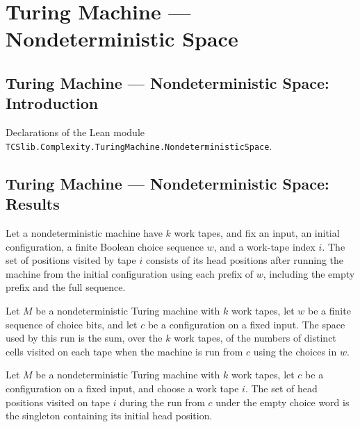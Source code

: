 \section{Turing Machine --- Nondeterministic Space}
\subsection*{Turing Machine --- Nondeterministic Space: Introduction}

Declarations of the Lean module \texttt{TCSlib.Complexity.TuringMachine.NondeterministicSpace}.

\subsection*{Turing Machine --- Nondeterministic Space: Results}

\begin{definition}
\label{Turing.NDTM.visitedWith}
\leanok
{}
Let a nondeterministic machine have $k$ work tapes, and fix an input, an initial
configuration, a finite Boolean choice sequence $w$, and a work-tape index $i$. The set
of positions visited by tape $i$ consists of its head positions after running the
machine from the initial configuration using each prefix of $w$, including the empty
prefix and the full sequence.
\end{definition}

\begin{definition}
\label{Turing.NDTM.spaceUsedWith}
\leanok
{}
Let $M$ be a nondeterministic Turing machine with $k$ work tapes, let $w$ be a finite
sequence of choice bits, and let $c$ be a configuration on a fixed input. The space used
by this run is the sum, over the $k$ work tapes, of the numbers of distinct cells
visited on each tape when the machine is run from $c$ using the choices in $w$.
\end{definition}

\begin{lemma}
\label{Turing.NDTM.visitedWith_nil}
\leanok
{}
Let $M$ be a nondeterministic Turing machine with $k$ work tapes, let $c$ be a
configuration on a fixed input, and choose a work tape $i$. The set of head positions
visited on tape $i$ during the run from $c$ under the empty choice word is the singleton
containing its initial head position.
\end{lemma}


